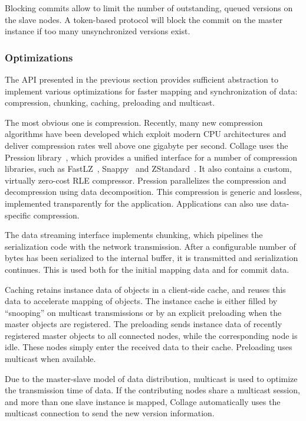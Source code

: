 Blocking commits allow to limit the number of outstanding, queued versions on
the slave nodes. A token-based protocol will block the commit on the master
instance if too many unsynchronized versions exist.

\subsubsection{Optimizations}

The API presented in the previous section provides sufficient abstraction to
implement various optimizations for faster mapping and synchronization of data:
compression, chunking, caching, preloading and multicast.

The most obvious one is compression. Recently, many new compression algorithms
have been developed which exploit modern CPU architectures and deliver
compression rates well above one gigabyte per second. \textsf{Collage} uses the
Pression library~\cite{pression}, which provides a unified interface for a
number of compression libraries, such as FastLZ~\cite{jesperfast},
Snappy~\cite{snappy} and ZStandard~\cite{zstd}. It also contains a custom,
virtually zero-cost RLE compressor. Pression parallelizes the compression and
decompression using data decomposition. This compression is generic and
lossless, implemented transparently for the application. Applications can also
use data-specific compression.

The data streaming interface implements chunking, which pipelines the
serialization code with the network transmission. After a configurable number of
bytes has been serialized to the internal buffer, it is transmitted and
serialization continues. This is used both for the initial mapping data and for
commit data.

Caching retains instance data of objects in a client-side cache, and reuses this
data to accelerate mapping of objects. The instance cache is either filled by
``snooping'' on multicast transmissions or by an explicit preloading when the
master objects are registered. The preloading sends instance data of recently
registered master objects to all connected nodes, while the corresponding node
is idle. These nodes simply enter the received data to their cache. Preloading
uses multicast when available.

Due to the master-slave model of data distribution, multicast is used to
optimize the transmission time of data. If the contributing nodes share a
multicast session, and more than one slave instance is mapped, \textsf{Collage}
automatically uses the multicast connection to send the new version information.

